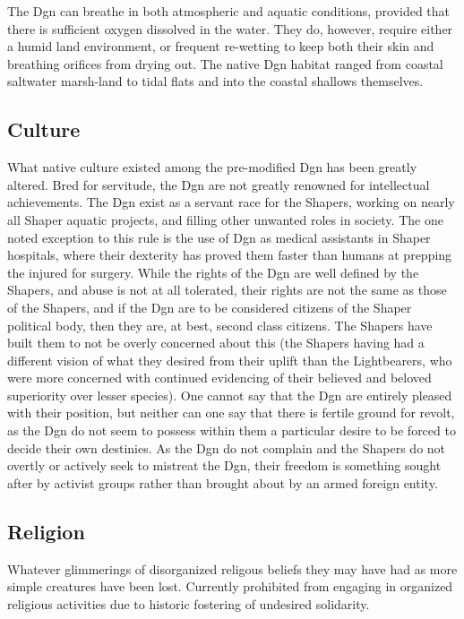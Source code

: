 The Dgn can breathe in both atmospheric and aquatic conditions,
provided that there is sufficient oxygen dissolved in the water. They
do, however, require either a humid land environment, or frequent
re-wetting to keep both their skin and breathing orifices from drying
out. The native Dgn habitat ranged from coastal saltwater marsh-land
to tidal flats and into the coastal shallows themselves.

\subsection{Culture}

What native culture existed among the pre-modified Dgn has been
greatly altered. Bred for servitude, the Dgn are not greatly renowned
for intellectual achievements. The Dgn exist as a servant race for the
Shapers, working on nearly all Shaper aquatic projects, and filling
other unwanted roles in society. The one noted exception to this rule
is the use of Dgn as medical assistants in Shaper hospitals, where
their dexterity has proved them faster than humans at prepping the
injured for surgery. While the rights of the Dgn are well defined by
the Shapers, and abuse is not at all tolerated, their rights are not
the same as those of the Shapers, and if the Dgn are to be considered
citizens of the Shaper political body, then they are, at best, second
class citizens. The Shapers have built them to not be overly concerned
about this (the Shapers having had a different vision of what they
desired from their uplift than the Lightbearers, who were more
concerned with continued evidencing of their believed and beloved
superiority over lesser species). One cannot say that the Dgn are
entirely pleased with their position, but neither can one say that
there is fertile ground for revolt, as the Dgn do not seem to possess
within them a particular desire to be forced to decide their own
destinies. As the Dgn do not complain and the Shapers do not overtly
or actively seek to mistreat the Dgn, their freedom is something
sought after by activist groups rather than brought about by an armed
foreign entity.

\subsection{Religion}

Whatever glimmerings of disorganized religous beliefs they may have
had as more simple creatures have been lost. Currently prohibited from
engaging in organized religious activities due to historic fostering
of undesired solidarity.

